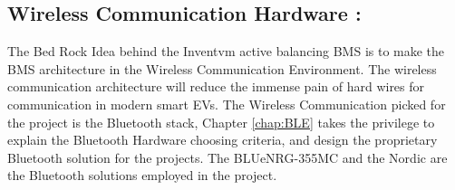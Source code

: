 \subsection{Wireless Communication Hardware :}
The Bed Rock Idea behind the Inventvm active balancing BMS is to make the BMS architecture in the Wireless Communication Environment. The wireless communication architecture will reduce the immense pain of hard wires for communication in modern smart EVs. The Wireless Communication picked for the project is the Bluetooth stack, Chapter \ref{chap:BLE} takes the privilege to explain the Bluetooth Hardware choosing criteria, and design the proprietary Bluetooth solution for the projects. The BLUeNRG-355MC\cite{BLNRG355_STEVAL_GUIDE} and the Nordic\cite{NORDIC_nrf52840_USERGUIDE} are the Bluetooth solutions employed in the project.